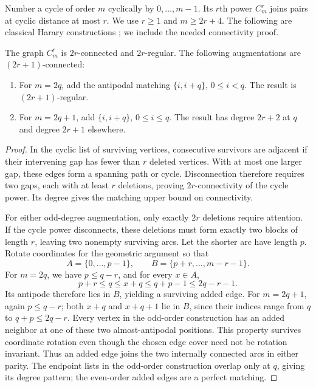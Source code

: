 Number a cycle of order $m$ cyclically by $0,\ldots,m-1$.
Its $r$th power $C_m^r$ joins pairs at cyclic distance at most $r$.
We use $r\ge1$ and $m\ge2r+4$.
The following are classical Harary constructions \cite{Harary}; we include the needed connectivity proof.

\begin{lemma}\label{lem:harary}
The graph $C_m^r$ is $2r$-connected and $2r$-regular. The following augmentations are $(2r+1)$-connected:
\begin{enumerate}
\item For $m=2q$, add the antipodal matching $\{i,i+q\}$, $0\le i<q$.
The result is $(2r+1)$-regular.
\item For $m=2q+1$, add $\{i,i+q\}$, $0\le i\le q$.
The result has degree $2r+2$ at $q$ and degree $2r+1$ elsewhere.
\end{enumerate}
\end{lemma}
\begin{proof}
In the cyclic list of surviving vertices, consecutive survivors are adjacent if their intervening gap has fewer than $r$ deleted vertices.
With at most one larger gap, these edges form a spanning path or cycle.
Disconnection therefore requires two gaps, each with at least $r$ deletions, proving $2r$-connectivity of the cycle power.
Its degree gives the matching upper bound on connectivity.

For either odd-degree augmentation, only exactly $2r$ deletions require attention.
If the cycle power disconnects, these deletions must form exactly two blocks of length $r$, leaving two nonempty surviving arcs.
Let the shorter arc have length $p$. Rotate coordinates for the geometric argument so that
\begin{equation}
A=\{0,\ldots,p-1\},\qquad B=\{p+r,\ldots,m-r-1\}.
\end{equation}
For $m=2q$, we have $p\le q-r$, and for every $x\in A$,
\begin{equation}
p+r\le q\le x+q\le q+p-1\le2q-r-1.
\end{equation}
Its antipode therefore lies in $B$, yielding a surviving added edge.
For $m=2q+1$, again $p\le q-r$; both $x+q$ and $x+q+1$ lie in $B$, since their indices range from $q$ to $q+p\le2q-r$.
Every vertex in the odd-order construction has an added neighbor at one of these two almost-antipodal positions.
This property survives coordinate rotation even though the chosen edge cover need not be rotation invariant.
Thus an added edge joins the two internally connected arcs in either parity.
The endpoint lists in the odd-order construction overlap only at $q$, giving its degree pattern; the even-order added edges are a perfect matching.
\end{proof}

